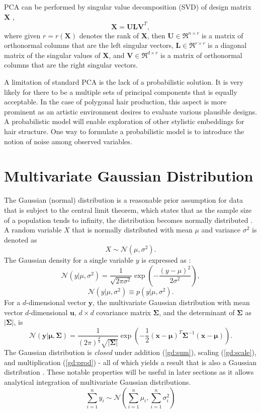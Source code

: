 \documentclass[ %
author={Dillon Keith Diep},
supervisor={Dr. Carl Henrik Ek},
degree={MEng},
title={ART-CG Hair:},
subtitle={Assisted Real-time Content Generation of Stylised Virtual Hair},
type={Research},
year={2017} ]{dissertation}
\begin{document}
PCA can be performed by singular value decomposition (SVD) of design matrix $\bm{X}$ \cite[pp.44-46]{pca2002},
$$\bm{X=ULV}^T,$$
where given $r = r(\bm{X})$ denotes the rank of $\bm{X}$, then
$\bm{U} \in \Re^{n \times r}$ is a matrix of orthonormal columns that are the left singular vectors,
$\bm{L} \in \Re^{r \times r}$ is a diagonal matrix of the singular values of $\bm{X}$, and
$\bm{V} \in \Re^{d \times r}$ is a matrix of orthonormal columns that are the right singular vectors.

A limitation of standard PCA is the lack of a probabilistic solution. 
It is very likely for there to be a multiple sets of principal components that is equally acceptable. In the case of polygonal hair production, this aspect is more prominent as an artistic environment desires to evaluate various plausible designs. A probabilistic model will enable exploration of other stylistic embeddings for hair structure. One way to formulate a probabilistic model is to introduce the notion of noise among observed variables.

\section{Multivariate Gaussian Distribution}
The Gaussian (normal) distribution is a reasonable prior assumption for data that is subject to the central limit theorem, which states that as the sample size of a population tends to infinity, the distribution becomes normally distributed \cite[p.78]{bishop}.
A random variable $X$ that is normally distributed with mean $\mu$ and variance $\sigma^2$ is denoted as
$$X\sim\mathcal{N}(\mu, \sigma^2).$$
The Gaussian density for a single variable $y$ is expressed as \cite[p.78]{bishop}:
$$\mathcal{N}(y|\mu, \sigma^2)=\frac{1}{\sqrt{2\pi\sigma^2}}\exp\left(-\frac{(y-\mu)^2}{2\sigma^2}\right),$$
$$\mathcal{N}(y|\mu,\sigma^2) \equiv p(y|\mu,\sigma^2).$$
For a $d$-dimensional vector $\bm{y}$, the multivariate Gaussian distribution with mean vector $d$-dimensional $\bm{u}$, $d \times d$ covariance matrix $\bm{\Sigma}$, and the determinant of $\bm{\Sigma}$ as $\bm{|\Sigma}|$, is
$$\mathcal{N}(\bm{y}|\bm{\mu}, \bm{\Sigma})=\frac{1}{(2\pi)^{\frac{d}{2}}\sqrt{|\bm{\Sigma}|}}
\exp\left(-\frac{1}{2}(\bm{x}-\bm{\mu})^T\bm{\Sigma}^{-1}(\bm{x}-\bm{\mu})\right).$$
The Gaussian distribution is \textit{closed} under addition (\ref{gd:sum}), scaling (\ref{gd:scale}), and multiplication (\ref{gd:prod}) - all of which yields a result that is also a Gaussian distribution \cite[p.200]{gp}. These notable properties will be useful in later sections as it allows analytical integration of multivariate Gaussian distributions.
\begin{equation} \label{gd:sum}
\sum^n_{i=1}y_i\sim\mathcal{N}(\sum^n_{i=1}\mu_i,\sum^n_{i=1}\sigma^2_i)
\end{equation}
\end{document}
